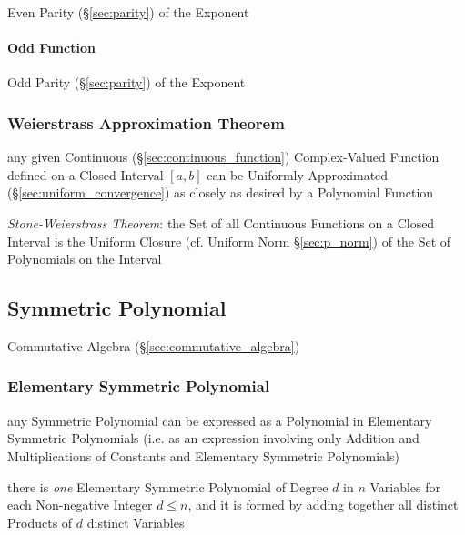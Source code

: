 Even Parity (\S\ref{sec:parity}) of the Exponent



\paragraph{Odd Function}\label{sec:odd_function}\hfill

Odd Parity (\S\ref{sec:parity}) of the Exponent



\subsubsection{Weierstrass Approximation Theorem}
\label{sec:weierstrass_approximation}

any given Continuous (\S\ref{sec:continuous_function}) Complex-Valued Function
defined on a Closed Interval $[a,b]$ can be Uniformly Approximated
(\S\ref{sec:uniform_convergence}) as closely as desired by a Polynomial Function

\emph{Stone-Weierstrass Theorem}: the Set of all Continuous Functions on a
Closed Interval is the Uniform Closure (cf. Uniform Norm \S\ref{sec:p_norm}) of
the Set of Polynomials on the Interval



\subsection{Symmetric Polynomial}\label{sec:symmetric_polynomial}

\fist Commutative Algebra (\S\ref{sec:commutative_algebra})



\subsubsection{Elementary Symmetric Polynomial}\label{sec:elementary_symmetric}

any Symmetric Polynomial can be expressed as a Polynomial in Elementary
Symmetric Polynomials (i.e. as an expression involving only Addition and
Multiplications of Constants and Elementary Symmetric Polynomials)

there is \emph{one} Elementary Symmetric Polynomial of Degree $d$ in $n$
Variables for each Non-negative Integer $d \leq n$, and it is formed by adding
together all distinct Products of $d$ distinct Variables




